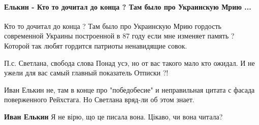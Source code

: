  
 
 
 
 
\paragraph{Елькин - Кто то дочитал до конца ? Там было про Украинскую Мрию ...}

\begin{itemize}
 

Кто то дочитал до конца ? Там было про Украинскую Мрию гордость современной
Украины построенной в 87 году если мне изменяет память ? Которой так любят
гордится патриоты ненавидящие совок. 

П.с. Светлана, свобода слова Понад усэ,
но от вас такого мало кто ожидал. И не ужели для вас самый главный показатель
Отписки ?!

 
Иван Елькин не, там в конце про "победобесие" и неправильная цитата с фасада поверженного Рейхстага. Но Светлана вряд-ли об этом знает.

 
\textbf{Иван Елькин} Я не вірю, що це писала вона. Цікаво, чи вона читала?

 

\end{itemize}
